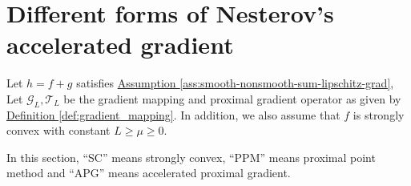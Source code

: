 \documentclass[12pt]{article}
\begin{document}

\section{Different forms of Nesterov's accelerated gradient}\label{sec:different-forms-acc-grad}
    \begin{assumption}\label{ass:smooth-non-smooth-lip-scvx}
        Let $h=f + g$ satisfies 
        \hyperref[ass:smooth-nonsmooth-sum-lipschitz-grad]
        {Assumption \ref*{ass:smooth-nonsmooth-sum-lipschitz-grad}}, 
        Let $\mathcal G_L, \mathcal T_L$ be the gradient mapping and proximal gradient operator as given by 
        \hyperref[def:gradient_mapping]
        {Definition \ref*{def:gradient_mapping}}. 
        In addition, we also assume that $f$ is strongly convex with constant $L \ge \mu \ge 0$. 
    \end{assumption}
        In this section, ``SC'' means strongly convex, ``PPM'' means proximal point method and ``APG'' means accelerated proximal gradient. 
        
\end{document}
